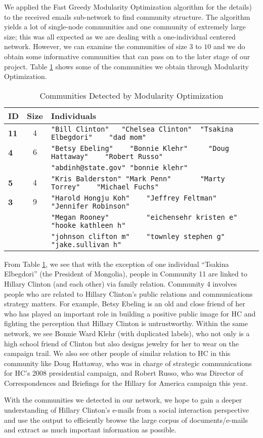 We applied the Fast Greedy Modularity Optimization algorithm \cite{greedy_mod} for the details) to the received emails sub-network to find community structure. 
The algorithm yields a lot of single-node communities and one community of extremely large size; this was all expected as we are dealing with a one-individual centered network. 
However, we can examine the communities of size $3$ to $10$ and we do obtain some informative communities that can pass on to the later stage of our project. 
Table \ref{tab:greedy} shows some of the communities we obtain through Modularity Optimization.
\begin{table}
\centering
\begin{tabular}{|l |c| l|}\hline
{\bf ID} & \bf Size & \bf Individuals \\ \hline \hline
\bf 11 & $4$ & \verb+"Bill Clinton"   "Chelsea Clinton"  "Tsakina Elbegdori"    "dad mom"+ \\ \hline
\bf 4 & $6$ & \verb+"Betsy Ebeling"    "Bonnie Klehr"     "Doug Hattaway"    "Robert Russo"+\\
&& \verb+"abdinh@state.gov" "bonnie klehr"+\\ \hline
{\bf 5} & $4$ &\verb+"Kris Balderston" "Mark Penn"       "Marty Torrey"    "Michael Fuchs"+\\ \hline
{\bf 3} & $9$ & \verb+"Harold Hongju Koh"    "Jeffrey Feltman"      "Jennifer Robinson"+\\
&& \verb+"Megan Rooney"         "eichensehr kristen e" "hooke kathleen h"+\\
&& \verb+"johnson clifton m"    "townley stephen g"    "jake.sullivan h"+ \\
\hline 
\end{tabular}
\caption{Communities Detected by Modularity Optimization}
\label{tab:greedy}
\end{table}
From Table \ref{tab:greedy}, we see that with the exception of one individual ``Tsakina Elbegdori'' (the President of Mongolia), people in Community 11 are linked to Hillary Clinton (and each other) via family relation. 
Community 4 involves people who are related to Hillary Clinton's public relations and communications strategy matters. 
For example, Betsy Ebeling is an old and close friend of her who has played an important role in building a positive public image for HC and fighting the perception that Hillary Clinton is untrustworthy. 
Within the same network, we see Bonnie Ward Klehr (with duplicated labels), who not only is a high school friend of Clinton but also designs jewelry for her to wear on the campaign trail. 
We also see other people of similar relation to HC in this community like Doug Hattaway, who was in charge of strategic communications for HC's 2008 presidential campaign, and Robert Russo, who was Director of Correspondences and Briefings for the Hillary for America campaign this year. 

With the communities we detected in our network, we hope to gain a deeper understanding of Hillary Clinton's e-mails from a social interaction perspective and use the output to efficiently browse the large corpus of documents/e-mails and extract as much important information as possible.
